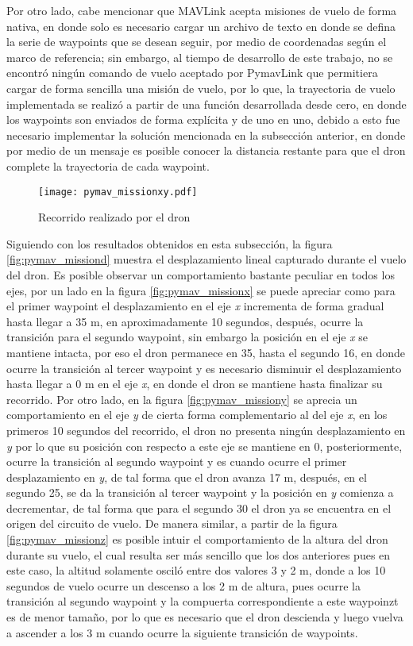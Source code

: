 Por otro lado, cabe mencionar que MAVLink acepta misiones de vuelo de forma nativa, en donde solo es necesario cargar un archivo de texto en donde se defina la serie de waypoints que se desean seguir, por medio de coordenadas según el marco de referencia; sin embargo, al tiempo de desarrollo de este trabajo, no se encontró ningún comando de vuelo aceptado por PymavLink que permitiera cargar de forma sencilla una misión de vuelo, por lo que, la trayectoria de vuelo implementada se realizó a partir de una función desarrollada desde cero, en donde los waypoints son enviados de forma explícita y de uno en uno, debido a esto fue necesario implementar la solución mencionada en la subsección anterior, en donde por medio de un mensaje es posible conocer la distancia restante para que el dron complete la trayectoria de cada waypoint.

\begin{figure}[ht]
    \centering
    \texttt{[image: pymav\_missionxy.pdf]}
    \caption{Recorrido realizado por el dron}
    \label{fig:pymav_missionxy}
\end{figure}

Siguiendo con los resultados obtenidos en esta subsección, la figura \ref{fig:pymav_missiond} muestra el desplazamiento lineal capturado durante el vuelo del dron. Es posible observar un comportamiento bastante peculiar en todos los ejes, por un lado en la figura \ref{fig:pymav_missionx} se puede apreciar como para el primer waypoint el desplazamiento en el eje \textit{x} incrementa de forma gradual hasta llegar a 35 m, en aproximadamente 10 segundos, después, ocurre la transición para el segundo waypoint, sin embargo la posición en el eje \textit{x} se mantiene intacta, por eso el dron permanece en 35, hasta el segundo 16, en donde ocurre la transición al tercer waypoint y es necesario disminuir el desplazamiento hasta llegar a 0 m en el eje \textit{x}, en donde el dron se mantiene hasta finalizar su recorrido. Por otro lado, en la figura \ref{fig:pymav_missiony} se aprecia un comportamiento en el eje \textit{y} de cierta forma complementario al del eje \textit{x}, en los primeros 10 segundos del recorrido, el dron no presenta ningún desplazamiento en \textit{y} por lo que su posición con respecto a este eje se mantiene en 0, posteriormente, ocurre la transición al segundo waypoint y es cuando ocurre el primer desplazamiento en \textit{y}, de tal forma que el dron avanza 17 m, después, en el segundo 25, se da la transición al tercer waypoint y la posición en \textit{y} comienza a decrementar, de tal forma que para el segundo 30 el dron ya se encuentra en el origen del circuito de vuelo. De manera similar, a partir de la figura \ref{fig:pymav_missionz} es posible intuir el comportamiento de la altura del dron durante su vuelo, el cual resulta ser más sencillo que los dos anteriores pues en este caso, la altitud solamente osciló entre dos valores 3 y 2 m, donde a los 10 segundos de vuelo ocurre un descenso a los 2 m de altura, pues ocurre la transición al segundo waypoint y la compuerta correspondiente  a este waypoinzt es de menor tamaño, por lo que es necesario que el dron descienda y luego vuelva a ascender a los 3 m cuando ocurre la siguiente transición de waypoints.

